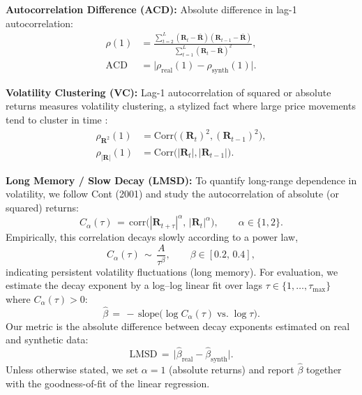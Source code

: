           \begin{enumerate}[label=\textbf{[M\arabic*]}, resume]

          \item \label{metric:acd} \textbf{Autocorrelation Difference 
          (ACD):}  
          Absolute difference in lag-1 autocorrelation:
          \[
          \begin{aligned}
          \rho(1) &= \frac{\sum_{t=2}^{L} (\mathbf{R}_t - \bar{\mathbf{R}})
          (\mathbf{R}_{t-1} - \bar{\mathbf{R}})}
            {\sum_{t=1}^{L} (\mathbf{R}_t - \bar{\mathbf{R}})^2}, \\
          \mathrm{ACD} &= \big|\rho_{\text{real}}(1) - 
          \rho_{\text{synth}}(1)\big|.
          \end{aligned}
          \]
          
          \item \label{metric:volclustering} \textbf{Volatility 
          Clustering (VC):}  
          Lag-1 autocorrelation of squared or absolute returns measures 
          volatility clustering, a stylized fact where large price movements 
          tend to cluster in time \cite{Cont01}:
          \[
          \begin{aligned}
          \rho_{\mathbf{R}^2}(1) &= \mathrm{Corr}\big((\mathbf{R}_t)^2, 
          (\mathbf{R}_{t-1})^2\big), \\
          \rho_{|\mathbf{R}|}(1) &= \mathrm{Corr}\big(|\mathbf{R}_t|, 
          |\mathbf{R}_{t-1}|\big).
          \end{aligned}
          \]

        \item \label{metric:slow_decay} \textbf{Long Memory / Slow Decay (LMSD):}  
        To quantify long-range dependence in volatility, we follow
        Cont (2001) \cite{Cont01} and study the autocorrelation of
        absolute (or squared) returns:
        \[
        C_\alpha(\tau) \,=\, \mathrm{corr}\!\big(|\mathbf{R}_{t+\tau}|^\alpha,\,
        |\mathbf{R}_t|^\alpha\big), \qquad \alpha \in \{1,2\}.
        \]
        Empirically, this correlation decays slowly according to a
        power law,
        \[
        C_\alpha(\tau) \,\sim\, \frac{A}{\tau^{\beta}}, \qquad
        \beta \in [0.2,\,0.4],
        \]
        indicating persistent volatility fluctuations (long memory).
        For evaluation, we estimate the decay exponent by a
        log--log linear fit over lags 
        \(\tau \in \{1,\ldots, \tau_{\max}\}\) where
        \(C_\alpha(\tau) > 0\):
        \[
        \widehat{\beta} \,=\, -\,\text{slope}\Big(\log C_\alpha(\tau)
        \;\text{vs.}\; \log \tau\Big).
        \]
        Our metric is the absolute difference between decay exponents
        estimated on real and synthetic data:
        \[
        \mathrm{LMSD} \,=\, \big|\widehat{\beta}_{\text{real}} -
        \widehat{\beta}_{\text{synth}}\big|.
        \]
        Unless otherwise stated, we set \(\alpha=1\) (absolute returns)
        and report \(\widehat{\beta}\) together with the goodness-of-fit
        of the linear regression.
        \end{enumerate}
